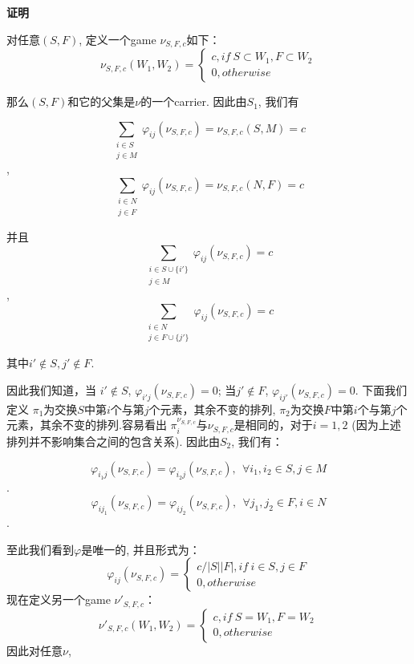 \textbf{证明}

对任意$(S,F)$, 定义一个game $\nu_{S,F,c}$如下：
\begin{equation}
	\nu_{S,F,c}(W_1, W_2)=\left\{
	\begin{array}{lr}
		c, if \ S\subset W_1, F\subset W_2\\
		0, otherwise  
	\end{array}
	\right.
\end{equation}

那么$(S,F)$和它的父集是$\nu$的一个carrier. 因此由$S_1$, 我们有

$$\sum_{\substack{i \in S\\j\in M}} \varphi_{ij}(\nu_{S,F,c}) = \nu_{S,F,c}(S, M) = c$$,
$$\sum_{\substack{i \in N\\j\in F}} \varphi_{ij}(\nu_{S,F,c}) = \nu_{S,F,c}(N, F) = c$$

并且
$$\sum_{\substack{i \in S\cup\{i'\}\\j\in M}} \varphi_{ij}(\nu_{S,F,c}) = c$$, 
$$\sum_{\substack{i \in N\\j\in F\cup\{j'\}}} \varphi_{ij}(\nu_{S,F,c}) = c$$

其中$i' \notin S, j' \notin F$.

因此我们知道，当 $i'\notin S$, $\varphi_{i'j}(\nu_{S,F,c}) = 0$; 当$j'\notin F$, $\varphi_{ij'}(\nu_{S,F,c}) = 0$. 下面我们定义 $\pi_1$为交换$S$中第$i$个与第$j$个元素，其余不变的排列, $\pi_2$为交换$F$中第$i$个与第$j$个元素，其余不变的排列.容易看出 
$\pi_i^{\nu_{S,F,c}}$与$\nu_{S,F,c}$是相同的，对于$i=1, 2$ (因为上述排列并不影响集合之间的包含关系). 因此由$S_2$, 我们有： 

$$\varphi_{i_1j}(\nu_{S,F,c}) = \varphi_{i_2j}(\nu_{S,F,c}), \ \ \forall i_1, i_2 \in S, j \in M$$.
$$\varphi_{ij_1}(\nu_{S,F,c}) = \varphi_{ij_2}(\nu_{S,F,c}), \ \ \forall j_1, j_2 \in F, i \in N$$.

至此我们看到$\varphi$是唯一的, 并且形式为： 
\begin{equation}
	\varphi_{ij}(\nu_{S,F,c})=\left\{
	\begin{array}{lr}
		c/|S||F|, if\ i \in S, j \in F\\
		0, otherwise
	\end{array}
	\right.
\end{equation}
现在定义另一个game $\nu'_{S,F,c}$：
\begin{equation}
	\nu'_{S,F,c}(W_1, W_2)=\left\{
	\begin{array}{lr}
		c, if \ S=W_1, F=W_2\\
		0, otherwise 
	\end{array}
	\right.
\end{equation}
因此对任意$\nu$, 

